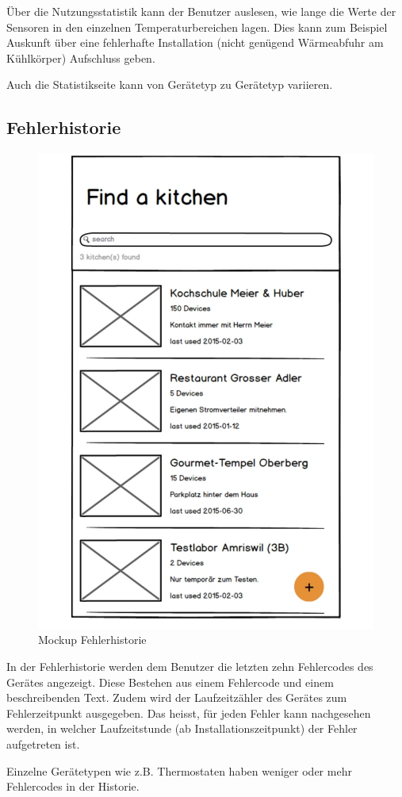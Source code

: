 Über die Nutzungsstatistik kann der Benutzer auslesen, wie lange die Werte der Sensoren in den einzelnen Temperaturbereichen lagen. Dies kann zum Beispiel Auskunft über eine fehlerhafte Installation (nicht genügend Wärmeabfuhr am Kühlkörper) Aufschluss geben.

Auch die Statistikseite kann von Gerätetyp zu Gerätetyp variieren.

\WFclear
\vspace{2cm}

\subsection{Fehlerhistorie}
\label{subsec:Fehlerhistorie}

\begin{figure}
	\begin{center}
		\includegraphics[page=8,trim=0 0 0 0,clip,scale=0.21]{uiux/res/mockups}
		\caption{Mockup Fehlerhistorie}
		\label{abb:mockDeviceErrors}
	\end{center}
\end{figure}

In der Fehlerhistorie werden dem Benutzer die letzten zehn Fehlercodes des Gerätes angezeigt. Diese Bestehen aus einem Fehlercode und einem beschreibenden Text. Zudem wird der Laufzeitzähler des Gerätes zum Fehlerzeitpunkt ausgegeben. Das heisst, für jeden Fehler kann nachgesehen werden, in welcher Laufzeitstunde (ab Installationszeitpunkt) der Fehler aufgetreten ist.

Einzelne Gerätetypen wie z.B. Thermostaten haben weniger oder mehr Fehlercodes in der Historie.